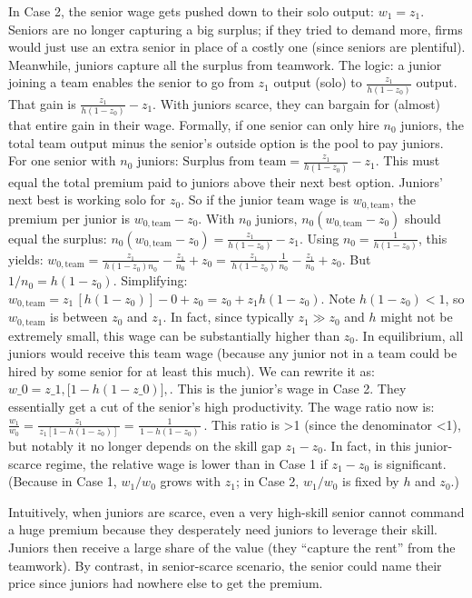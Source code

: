 \documentclass[12pt]{article}
\begin{document}
\begin{itemize}
  In Case 2, the {senior wage gets pushed down to their solo
  output}: \(w_1 = z_1.\) Seniors are no longer capturing a big surplus;
  if they tried to demand more, firms would just use an extra senior in
  place of a costly one (since seniors are plentiful). Meanwhile,
  {juniors capture all the surplus from teamwork}. The logic: a
  junior joining a team enables the senior to go from \(z_1\) output
  (solo) to \(\frac{z_1}{h(1-z_0)}\) output. That gain is
  \(\frac{z_1}{h(1-z_0)} - z_1\). With juniors scarce, they can bargain
  for (almost) that entire gain in their wage. Formally, if one senior
  can only hire \(n_0\) juniors, the total team output minus the
  senior's outside option is the pool to pay juniors. For one senior
  with \(n_0\) juniors:
  \(\text{Surplus from team} = \frac{z_1}{h(1-z_0)} - z_1.\) This must
  equal the total premium paid to juniors above their next best option.
  Juniors' next best is working solo for \(z_0\). So if the junior team
  wage is \(w_{0,\text{team}}\), the premium per junior is
  \(w_{0,\text{team}} - z_0\). With \(n_0\) juniors,
  \(n_0 (w_{0,\text{team}} - z_0)\) should equal the surplus:
  \(n_0 (w_{0,\text{team}} - z_0) = \frac{z_1}{h(1-z_0)} - z_1.\) Using
  \(n_0 = \frac{1}{h(1-z_0)}\), this yields:
  \(w_{0,\text{team}} = \frac{z_1}{\,h(1-z_0) n_0\,} - \frac{z_1}{n_0} + z_0 = \frac{z_1}{\,h(1-z_0)\,} \frac{1}{n_0} - \frac{z_1}{n_0} + z_0.\)
  But \(1/n_0 = h(1-z_0)\). Simplifying:
  \(w_{0,\text{team}} = z_1\, [h(1-z_0)] - 0 + z_0 = z_0 + z_1 h(1-z_0).\)
  Note \(h(1-z_0) < 1\), so \(w_{0,\text{team}}\) is between \(z_0\) and
  \(z_1\). In fact, since typically \(z_1 \gg z_0\) and \(h\) might not
  be extremely small, this wage can be substantially higher than
  \(z_0\). In equilibrium, all juniors would receive this team wage
  (because any junior not in a team could be hired by some senior for at
  least this much). We can rewrite it as: $ w\_0 = z\_1,{[}1 - h
  (1-z\_0){]},. \tag{6}$ This is the {junior's wage in Case 2}.
  They essentially get a cut of the senior's high productivity. The
  {wage ratio} now is:
  \(\frac{w_1}{w_0} = \frac{z_1}{\,z_1[1 - h(1-z_0)]\,} = \frac{1}{\,1 - h(1-z_0)\,}\,.\)
  This ratio is \textgreater1 (since the denominator \textless1), but
  notably it no longer depends on the skill gap \(z_1 - z_0\). In fact,
  in this junior-scarce regime, the {relative wage is lower} than
  in Case 1 if \(z_1 - z_0\) is significant. (Because in Case 1,
  \(w_1/w_0\) grows with \(z_1\); in Case 2, \(w_1/w_0\) is fixed by
  \(h\) and \(z_0\).)

  Intuitively, when juniors are scarce, even a very high-skill senior
  cannot command a huge premium because they desperately need juniors to
  leverage their skill. Juniors then receive a large share of the value
  (they ``capture the rent'' from the teamwork). By contrast, in
  senior-scarce scenario, the senior could name their price since
  juniors had nowhere else to get the premium.
\end{itemize}
\end{document}
